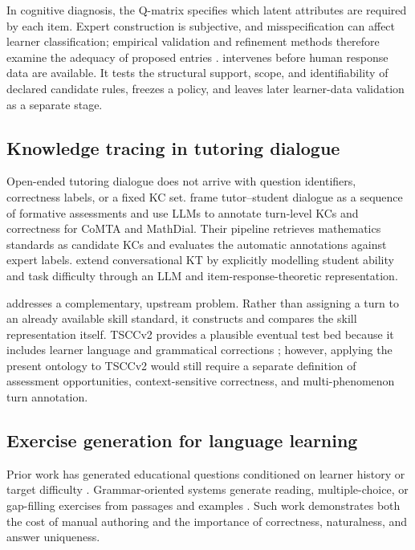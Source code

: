In cognitive diagnosis, the Q-matrix specifies which latent attributes are
required by each item.  Expert construction is subjective, and
misspecification can affect learner classification; empirical validation and
refinement methods therefore examine the adequacy of proposed entries
\citep{de-la-torre-chiu-2016,pardos-dadu-2018}.  \system intervenes before human
response data are available.  It tests the structural support, scope, and
identifiability of declared candidate rules, freezes a policy, and leaves later
learner-data validation as a separate stage.

\subsection{Knowledge tracing in tutoring dialogue}

Open-ended tutoring dialogue does not arrive with question identifiers,
correctness labels, or a fixed KC set.  \citet{scarlatos-etal-2025-dialogue}
frame tutor--student dialogue as a sequence of formative assessments and use
LLMs to annotate turn-level KCs and correctness for CoMTA and MathDial.  Their
pipeline retrieves mathematics standards as candidate KCs and evaluates the
automatic annotations against expert labels.  \citet{huang-etal-2026-interpretable}
extend conversational KT by explicitly modelling student ability and task
difficulty through an LLM and item-response-theoretic representation.

\system addresses a complementary, upstream problem.  Rather than assigning a
turn to an already available skill standard, it constructs and compares the
skill representation itself.  TSCCv2 provides a plausible eventual test bed
because it includes learner language and grammatical corrections
\citep{caines-etal-2022-teacher}; however, applying the present ontology to
TSCCv2 would still require a separate definition of assessment opportunities,
context-sensitive correctness, and multi-phenomenon turn annotation.

\subsection{Exercise generation for language learning}

Prior work has generated educational questions conditioned on learner history
or target difficulty \citep{srivastava-goodman-2021-question,cui-sachan-2023-adaptive}.
Grammar-oriented systems generate reading, multiple-choice, or gap-filling
exercises from passages and examples
\citep{chan-etal-2022-agree,bitew-etal-2023-learning}.  Such work demonstrates
both the cost of manual authoring and the importance of correctness,
naturalness, and answer uniqueness.


